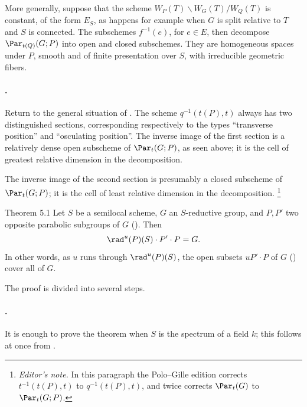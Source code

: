 More generally, suppose that the scheme
\(W_P(T)\backslash W_G(T)/W_Q(T)\) is constant, of the form \(E_S\),
as happens for example when \(G\) is split relative to \(T\) and
\(S\) is connected.  The subschemes \(f^{-1}(e)\), for \(e\in E\),
then decompose \(\Par_{t(Q)}(G;P)\) into open and closed subschemes.
They are homogeneous spaces under \(P\), smooth and of finite
presentation over \(S\), with irreducible geometric fibers.

\paragraph{.}
Return to the general situation of .  The scheme
\(q^{-1}(t(P),t)\) always has two distinguished sections,
corresponding respectively to the types ``transverse position'' and
``osculating position''.  The inverse image of the first section is
a relatively dense open subscheme of \(\Par_t(G;P)\), as seen above;
it is the cell of greatest relative dimension in the decomposition.

The inverse image of the second section is presumably a closed
subscheme of \(\Par_t(G;P)\); it is the cell of least relative
dimension in the decomposition.
\footnote{\emph{Editor's note.} In this paragraph the Polo--Gille
edition corrects \(t^{-1}(t(P),t)\) to \(q^{-1}(t(P),t)\), and twice
corrects \(\Par_t(G)\) to \(\Par_t(G;P)\).}



\begin{sgastatement}{Theorem 5.1}
Let \(S\) be a semilocal scheme, \(G\) an \(S\)-reductive group, and
\(P,P'\) two opposite parabolic subgroups of \(G\) \textup{()}.
Then
\[
 \rad^u(P)(S)\cdot P'\cdot P=G.
\]
In other words, as \(u\) runs through \(\rad^u(P)(S)\), the open
subsets \(uP'\cdot P\) of \(G\) \textup{()} cover all of \(G\).
\end{sgastatement}

The proof is divided into several steps.

\paragraph{.}
It is enough to prove the theorem when \(S\) is the spectrum of a
field \(k\); this follows at once from .


